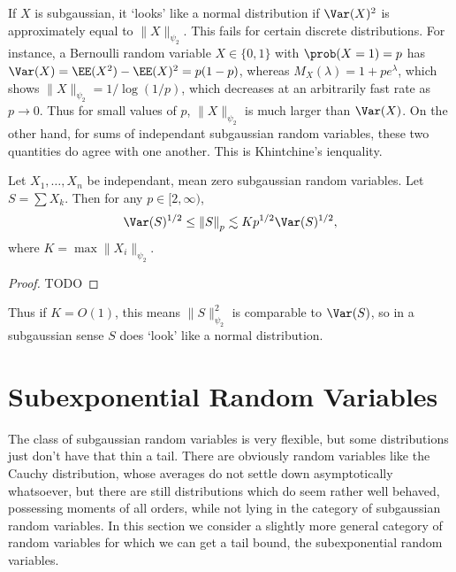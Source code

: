 If $X$ is subgaussian, it `looks' like a normal distribution if $\Var(X)^2$ is approximately equal to $\| X \|_{\psi_2}$. This fails for certain discrete distributions. For instance, a Bernoulli random variable $X \in \{ 0, 1 \}$ with $\prob(X = 1) = p$ has $\Var(X) = \EE(X^2) - \EE(X)^2 = p(1-p)$, whereas $M_X(\lambda) = 1 + pe^\lambda$, which shows $\| X \|_{\psi_2} = 1/\log(1/p)$, which decreases at an arbitrarily fast rate as $p \to 0$. Thus for small values of $p$, $\| X \|_{\psi_2}$ is much larger than $\Var(X)$. On the other hand, for sums of independant subgaussian random variables, these two quantities do agree with one another. This is Khintchine's ienquality.

\begin{theorem}[Khintchine]
    Let $X_1, \dots, X_n$ be independant, mean zero subgaussian random variables. Let $S = \sum X_k$. Then for any $p \in [2,\infty)$,
    \[ \Var(S)^{1/2} \leq \left\| S \right\|_p \lesssim K p^{1/2} \Var(S)^{1/2}, \]
    where $K = \max \| X_i \|_{\psi_2}$.
\end{theorem}
\begin{proof}
    TODO
\end{proof}

Thus if $K = O(1)$, this means $\| S \|_{\psi_2}^2$ is comparable to $\Var(S)$, so in a subgaussian sense $S$ does `look' like a normal distribution.






\section{Subexponential Random Variables}

The class of subgaussian random variables is very flexible, but some distributions just don't have that thin a tail. There are obviously random variables like the Cauchy distribution, whose averages do not settle down asymptotically whatsoever, but there are still distributions which do seem rather well behaved, possessing moments of all orders, while not lying in the category of subgaussian random variables. In this section we consider a slightly more general category of random variables for which we can get a tail bound, the subexponential random variables.

